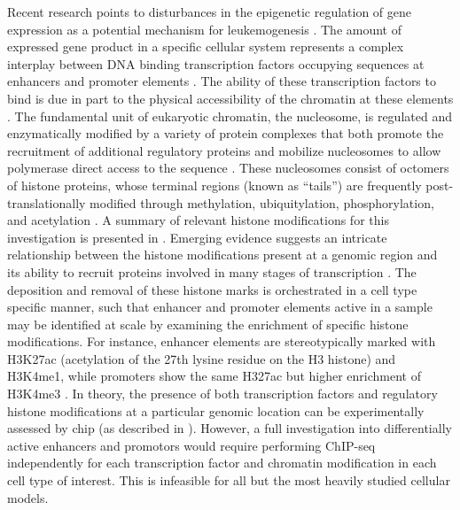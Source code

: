 Recent research points to disturbances in the epigenetic regulation of gene expression as a potential mechanism for leukemogenesis \cite{Krivtsov2007}. 
The amount of expressed gene product in a specific cellular system represents a complex interplay between DNA binding transcription factors occupying sequences at enhancers and promoter elements \cite{Cierpicki2010}.  
The ability of these transcription factors to bind is due in part to the physical accessibility of the chromatin at these elements \cite{Tsompana2014}. 
The fundamental unit of eukaryotic chromatin, the nucleosome, is regulated and enzymatically modified by a variety of protein complexes that both promote the recruitment of additional regulatory proteins and mobilize nucleosomes to allow polymerase 
direct access to the sequence \cite{Klemm2019a,Hu2016}. 
These nucleosomes consist of octomers of histone proteins, whose terminal regions (known as ``tails'') are frequently post-translationally modified through methylation, ubiquitylation, phosphorylation, and acetylation \cite{Gates2017}.
A summary of relevant histone modifications for this investigation is presented in . 
Emerging evidence suggests an intricate relationship between the histone modifications present at a genomic region and its ability to recruit proteins involved in many stages of transcription \cite{Bae2020a,Sharifi-Zarchi2017,Calo2013a,Spitz2012}. 
The deposition and removal of these histone marks is orchestrated in a cell type specific manner, such that enhancer and promoter elements active in a sample may be identified at scale by examining the enrichment of specific histone modifications. 
For instance, enhancer elements are stereotypically marked with H3K27ac (acetylation of the 27th lysine residue on the H3 histone) and H3K4me1, while promoters show the same H327ac but higher enrichment of H3K4me3 \cite{Margueron2005}.  
In theory, the presence of both transcription factors and regulatory histone modifications at a particular genomic location can be experimentally assessed by \gls{chip} (as described in ). 
However, a full investigation into differentially active enhancers and promotors would require performing ChIP-seq independently for each transcription factor and chromatin modification in each cell type of interest. 
This is infeasible for all but the most heavily studied cellular models.  
